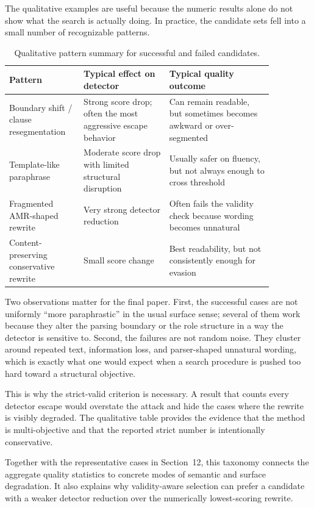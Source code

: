 The qualitative examples are useful because the numeric results alone do not show what the search is actually doing. In practice, the candidate sets fell into a small number of recognizable patterns.

\begin{table}[H]
\centering
\begin{tabular}{p{0.23\linewidth}p{0.29\linewidth}p{0.34\linewidth}}
\toprule
Pattern & Typical effect on detector & Typical quality outcome \\
\midrule
Boundary shift / clause resegmentation & Strong score drop; often the most aggressive escape behavior & Can remain readable, but sometimes becomes awkward or over-segmented \\
Template-like paraphrase & Moderate score drop with limited structural disruption & Usually safer on fluency, but not always enough to cross threshold \\
Fragmented AMR-shaped rewrite & Very strong detector reduction & Often fails the validity check because wording becomes unnatural \\
Content-preserving conservative rewrite & Small score change & Best readability, but not consistently enough for evasion \\
\bottomrule
\end{tabular}
\caption{Qualitative pattern summary for successful and failed candidates.}
\label{tab:qual_patterns}
\end{table}

Two observations matter for the final paper. First, the successful cases are not uniformly ``more paraphrastic'' in the usual surface sense; several of them work because they alter the parsing boundary or the role structure in a way the detector is sensitive to. Second, the failures are not random noise. They cluster around repeated text, information loss, and parser-shaped unnatural wording, which is exactly what one would expect when a search procedure is pushed too hard toward a structural objective.

This is why the strict-valid criterion is necessary. A result that counts every detector escape would overstate the attack and hide the cases where the rewrite is visibly degraded. The qualitative table provides the evidence that the method is multi-objective and that the reported strict number is intentionally conservative.

Together with the representative cases in Section~12, this taxonomy connects the aggregate quality statistics to concrete modes of semantic and surface degradation. It also explains why validity-aware selection can prefer a candidate with a weaker detector reduction over the numerically lowest-scoring rewrite.
